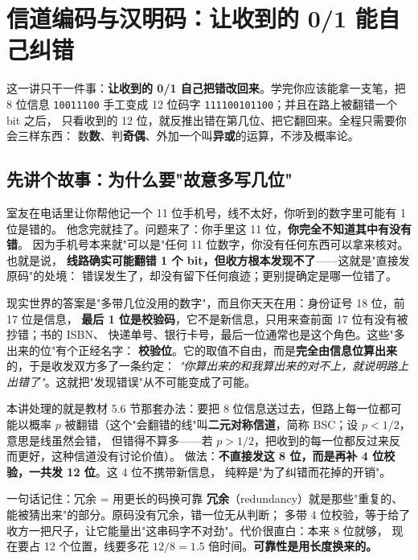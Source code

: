 \section{信道编码与汉明码：让收到的 0/1 能自己纠错}

这一讲只干一件事：\textbf{让收到的 0/1 自己把错改回来}。学完你应该能拿一支笔，把 8 位信息
\texttt{10011100} 手工变成 12 位码字 \texttt{111100101100}；并且在路上被翻错一个 bit 之后，
只看收到的 12 位，就反推出错在第几位、把它翻回来。全程只需要你会三样东西：
数\textbf{数}、判\textbf{奇偶}、外加一个叫\textbf{异或}的运算，不涉及概率论。

\subsection{先讲个故事：为什么要"故意多写几位"}

室友在电话里让你帮他记一个 11 位手机号，线不太好，你听到的数字里可能有 1 位是错的。
他念完就挂了。问题来了：你手里这 11 位，\textbf{你完全不知道其中有没有错}。
因为手机号本来就"可以是"任何 11 位数字，你没有任何东西可以拿来核对。也就是说，
\textbf{线路确实可能翻错 1 个 bit，但收方根本发现不了}——这就是"直接发原码"的处境：
错误发生了，却没有留下任何痕迹；更别提确定是哪一位错了。

现实世界的答案是"多带几位没用的数字"，而且你天天在用：身份证号 18 位，前 17 位是信息，
\textbf{最后 1 位是校验码}，它不是新信息，只用来查前面 17 位有没有被抄错；书的 ISBN、
快递单号、银行卡号，最后一位通常也是这个角色。这些"多出来的位"有个正经名字：
\textbf{校验位}。它的取值不自由，而是\textbf{完全由信息位算出来}的，于是收发双方多了一条约定：
\emph{"你算出来的和我算出来的对不上，就说明路上出错了"}。这就把"发现错误"从不可能变成了可能。

本讲处理的就是教材 5.6 节那套办法：要把 8 位信息送过去，但路上每一位都可能以概率 $p$
被翻错（这个"会翻错的线"叫\textbf{二元对称信道}，简称 BSC；设 $p<1/2$，意思是线虽然会错，
但错得不算多——若 $p>1/2$，把收到的每一位都反过来反而更好，这种信道没有讨论价值）。
做法：\textbf{不直接发这 8 位，而是再补 4 位校验，一共发 12 位}。这 4 位不携带新信息，
纯粹是"为了纠错而花掉的开销"。

\begin{idea}{一句话记住：冗余 = 用更长的码换可靠}
\textbf{冗余}（redundancy）就是那些"重复的、能被猜出来"的部分。原码没有冗余，错一位无从判断；
多带 4 位校验，等于给了收方一把尺子，让它能量出"这串码字不对劲"。代价很直白：本来 8 位就够，
现在要占 12 个位置，线要多花 $12/8=1.5$ 倍时间。\textbf{可靠性是用长度换来的。}
\end{idea}

